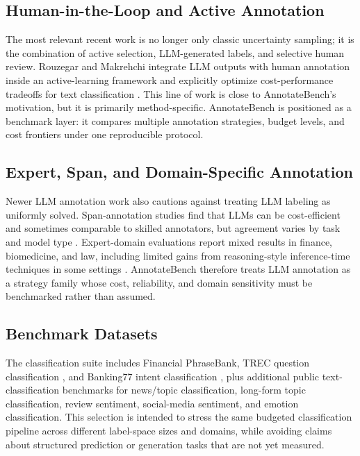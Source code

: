 \documentclass[11pt]{article}
\begin{document}
\subsection{Human-in-the-Loop and Active Annotation}

The most relevant recent work is no longer only classic uncertainty sampling; it is the combination of active selection, LLM-generated labels, and selective human review. Rouzegar and Makrehchi integrate LLM outputs with human annotation inside an active-learning framework and explicitly optimize cost-performance tradeoffs for text classification \citep{rouzegar2024llmdriven}. This line of work is close to AnnotateBench's motivation, but it is primarily method-specific. AnnotateBench is positioned as a benchmark layer: it compares multiple annotation strategies, budget levels, and cost frontiers under one reproducible protocol.

\subsection{Expert, Span, and Domain-Specific Annotation}

Newer LLM annotation work also cautions against treating LLM labeling as uniformly solved. Span-annotation studies find that LLMs can be cost-efficient and sometimes comparable to skilled annotators, but agreement varies by task and model type \citep{kasner2025spanannotators}. Expert-domain evaluations report mixed results in finance, biomedicine, and law, including limited gains from reasoning-style inference-time techniques in some settings \citep{tseng2025expertannotators}. AnnotateBench therefore treats LLM annotation as a strategy family whose cost, reliability, and domain sensitivity must be benchmarked rather than assumed.

\subsection{Benchmark Datasets}

The classification suite includes Financial PhraseBank, TREC question classification \citep{li2002learning}, and Banking77 intent classification \citep{casanueva2020efficient}, plus additional public text-classification benchmarks for news/topic classification, long-form topic classification, review sentiment, social-media sentiment, and emotion classification. This selection is intended to stress the same budgeted classification pipeline across different label-space sizes and domains, while avoiding claims about structured prediction or generation tasks that are not yet measured.
\end{document}
